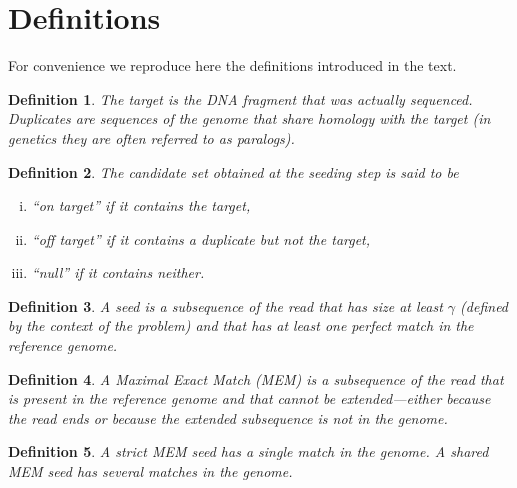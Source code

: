 \documentclass{article}
\newtheorem{definition}{Definition}
\begin{document}





\appendix

\section{Definitions}
\setcounter{definition}{0}

For convenience we reproduce here the definitions introduced in the text.

\begin{definition}
The target is the DNA fragment that was actually sequenced. Duplicates are
sequences of the genome that share homology with the target (in genetics
they are often referred to as paralogs).
\end{definition}

\begin{definition}
The candidate set obtained at the seeding step is said to be
\begin{enumerate}[i)]
\item ``on target'' if it contains the target,
\item ``off target'' if it contains a duplicate but not the target, 
\item ``null'' if it contains neither.
\end{enumerate}
\end{definition}

\begin{definition}
A seed is a subsequence of the read that has size at least $\gamma$
(defined by the context of the problem) and that has at least one perfect
match in the reference genome.
\end{definition}

\begin{definition}
A Maximal Exact Match (MEM) is a subsequence of the read that is present
in the reference genome and that cannot be extended---either because the
read ends or because the extended subsequence is not in the genome.
\end{definition}

\begin{definition}
A \emph{strict} MEM seed has a single match in the genome.
A \emph{shared} MEM seed has several matches in the genome.
\end{definition}
\end{document}
